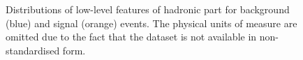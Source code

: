 \documentclass[../main/main.tex]{subfiles}
\begin{document}
\begin{figure}[!h]
    \begin{minipage}[c]{0.25\linewidth}
        \vspace{0pt}
        \centering
    \end{minipage}%
    \begin{minipage}[c]{0.25\linewidth}
        \vspace{0pt}
        \centering
    \end{minipage}%
    \caption{Distributions of low-level features of hadronic part for background (blue) and signal (orange) events. The physical units of measure are omitted due to the fact that the dataset is not available in non-standardised form.}
    \label{fig:appendix_low_features_hadronic}
\end{figure}
\end{document}
